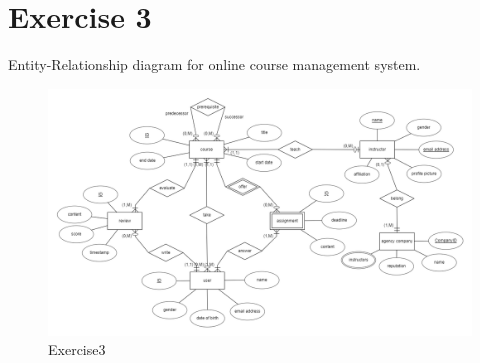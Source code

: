 \documentclass[]{article}
\begin{document}
\clearpage
\section{Exercise 3}

Entity-Relationship diagram for online course management system.
\begin{figure}[H]
	\centering
	\includegraphics[width=1.13\linewidth]{./document-H1/Homework1-exercise3}
	\caption{Exercise3}
	\label{fig:homework1-exercise3}
\end{figure}
\end{document}
